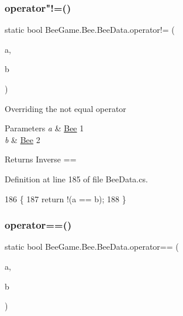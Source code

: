 \subsubsection{\texorpdfstring{operator"!=()}{operator!=()}}
{\footnotesize\ttfamily static bool Bee\+Game.\+Bee.\+Bee\+Data.\+operator!= (\begin{DoxyParamCaption}\item[{\hyperlink{struct_bee_game_1_1_bee_1_1_bee_data}{Bee\+Data}}]{a,  }\item[{\hyperlink{struct_bee_game_1_1_bee_1_1_bee_data}{Bee\+Data}}]{b }\end{DoxyParamCaption})\hspace{0.3cm}{\ttfamily [static]}}



Overriding the not equal operator 


\begin{DoxyParams}{Parameters}
{\em a} & \hyperlink{namespace_bee_game_1_1_bee}{Bee} 1\\
\hline
{\em b} & \hyperlink{namespace_bee_game_1_1_bee}{Bee} 2\\
\hline
\end{DoxyParams}
\begin{DoxyReturn}{Returns}
Inverse ==
\end{DoxyReturn}


Definition at line 185 of file Bee\+Data.\+cs.


\begin{DoxyCode}
186         \{
187             \textcolor{keywordflow}{return} !(a == b);
188         \}
\end{DoxyCode}
\mbox{\label{struct_bee_game_1_1_bee_1_1_bee_data_aafcbf3edbd35377ba1ed6bd1597427f2}} 
\subsubsection{\texorpdfstring{operator==()}{operator==()}}
{\footnotesize\ttfamily static bool Bee\+Game.\+Bee.\+Bee\+Data.\+operator== (\begin{DoxyParamCaption}\item[{\hyperlink{struct_bee_game_1_1_bee_1_1_bee_data}{Bee\+Data}}]{a,  }\item[{\hyperlink{struct_bee_game_1_1_bee_1_1_bee_data}{Bee\+Data}}]{b }\end{DoxyParamCaption})\hspace{0.3cm}{\ttfamily [static]}}



